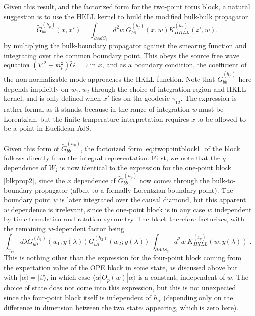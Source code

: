 \documentclass[12pt]{article}
\def\p{\partial}
\begin{document}
Given this result, and the factorized form for the two-point torus block, a natural suggestion is to use the HKLL kernel to build the modified bulk-bulk propagator
%
\begin{equation}
\tilde{G}^{(h_p)}_{bb}(x,x')
=\int_{\partial AdS_3} d^2 w ~
G^{(h_p)}_{b\partial}(x,w)
K^{(h_p)}_{HKLL}(x',w),
 \end{equation}
%
by multiplying the bulk-boundary propagator against the smearing function and integrating over the common boundary point.  This obeys the source free wave equation $(\nabla^2 -m_p^2)\tilde{G}=0$ in $x$, and as a boundary condition, the coefficient of the non-normalizable mode approaches the HKLL function. Note that $\tilde{G}^{(h_p)}_{bb}$ here depends implicitly on $w_1,w_2$ through the choice of integration region and HKLL kernel, and is only defined when $x'$ lies on the geodesic $\gamma_{12}$. The expression is rather formal as it stands, because in the range of integration $w$ must be Lorentzian, but the finite-temperature interpretation requires $x$ to be allowed to be a point in Euclidean AdS.
%

Given this form of $\tilde{G}^{(h_p)}_{bb}$, the factorized form \cref{eq:twopointblock1} of the block follows directly from the integral representation. First, we note that the $q$ dependence of $W_2$ is now identical to the expression for the one-point block \cref{blkprop2}, since the $x$ dependence of $\tilde{G}^{(h_p)}_{bb}$ now comes through the bulk-to-boundary propagator (albeit to a formally Lorentzian boundary point). The boundary point $w$ is later integrated over the causal diamond, but this apparent $w$ dependence is irrelevant, since the one-point block is in any case $w$ independent by time translation and rotation symmetry. The block therefore factorizes, with the remaining $w$-dependent factor being
\begin{equation}
\int_{ \gamma_{12}} d \lambda
G^{(h_1)}_{b\p}(w_1;y(\lambda))
G^{(h_2)}_{b\p}(w_2;y(\lambda))\,
\int_{\partial AdS_3} d^2 w \:
K^{(h_p)}_{HKLL}(w;y(\lambda))\; .
\end{equation}
This is nothing other than the expression for the four-point block coming from the expectation value of the OPE block in some state, as discussed above but with $|\alpha\rangle=|\beta\rangle$, in which case $\langle\alpha|O_p(w)|\alpha\rangle$ is a constant, independent of $w$. The choice of state does not come into this expression, but this is not unexpected since the four-point block itself is independent of $h_\alpha$ (depending only on the difference in dimension between the two states appearing, which is zero here).
\end{document}
